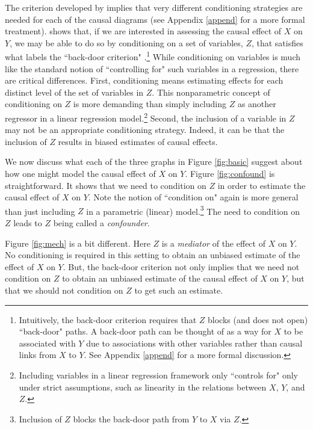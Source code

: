 \documentclass[12pt,reqno,titlepage]{amsart}
\begin{document}
\begin{doublespace}
The criterion developed by \citet{Pearl:2009vo} implies that very different conditioning strategies are needed for each of the causal diagrams (see Appendix \ref{append} for a more formal treatment). 
\citet{Pearl:2009vo} shows that, if we are interested in assessing the causal effect of $X$ on $Y$, we may be able to do so by conditioning on a set of variables, $Z$, that satisfies what \citet{Pearl:2009vo} labels the ``back-door criterion" \citep[p.79]{Pearl:2009vo}.\footnote{
Intuitively, the back-door criterion requires that $Z$ blocks (and does not open) ``back-door" paths.
A back-door path can be thought of as a way for $X$ to be associated with $Y$ due to associations with other variables rather than causal links from $X$ to $Y$.
See Appendix \ref{append} for a more formal discussion.}
While conditioning on variables is much like the standard notion of ``controlling for" such variables in a regression, there are critical differences.
First, conditioning means estimating effects for each distinct level of the set of variables in $Z$. 
This nonparametric concept of conditioning on $Z$ is more demanding than simply including $Z$ as another regressor in a linear regression model.\footnote{Including variables in a linear regression framework only ``controls for" only under strict assumptions, such as linearity in the relations between $X$, $Y$, and $Z$.}
Second, the inclusion of a variable in $Z$ may not be an appropriate conditioning strategy. Indeed, it can be that the inclusion of $Z$ results in biased estimates of causal effects.

We now discuss what each of the three graphs in Figure \ref{fig:basic} suggest about how one might model the causal effect of $X$ on $Y$.	
Figure \ref{fig:confound} is straightforward. It shows that we need to condition on $Z$ in order to estimate the causal effect of $X$ on $Y$.
Note the notion of ``condition on" again is more general than just including $Z$ in a parametric (linear) model.\footnote{
Inclusion of $Z$ blocks the back-door path from $Y$ to $X$ via $Z$.} The need to condition on $Z$ leads to $Z$ being called a \emph{confounder}.


Figure \ref{fig:mech} is a bit different. Here $Z$ is a \emph{mediator} of the effect of $X$ on $Y$.
No conditioning is required in this setting to obtain an unbiased estimate of the effect of $X$ on $Y$.
But, the back-door criterion not only implies that we need not condition on $Z$ to obtain an unbiased estimate of the causal effect of $X$ on $Y$, but that we should not condition on $Z$ to get such an estimate.


\end{doublespace}
\end{document}
